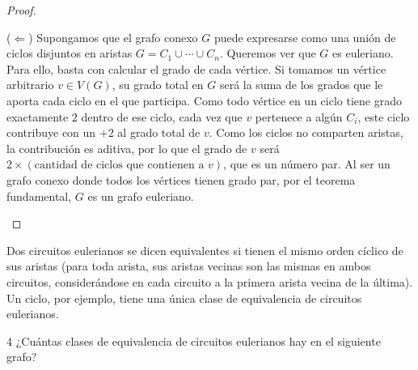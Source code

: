 \begin{proof}
\begin{enumerate}
              (\( \Longleftarrow \)) Supongamos que el grafo conexo \(G\) puede expresarse como una unión de ciclos disjuntos en aristas \(G = C_1 \cup \cdots \cup C_n\).
              Queremos ver que \(G\) es euleriano. Para ello, basta con calcular el grado de cada vértice. Si tomamos un vértice arbitrario \(v \in V(G)\), su grado total en \(G\) será la suma de los grados que le aporta cada ciclo en el que participa.
              Como todo vértice en un ciclo tiene grado exactamente 2 dentro de ese ciclo, cada vez que \(v\) pertenece a algún \(C_i\), este ciclo contribuye con un \(+2\) al grado total de \(v\).
              Como los ciclos no comparten aristas, la contribución es aditiva, por lo que el grado de \(v\) será \(2 \times (\text{cantidad de ciclos que contienen a } v)\), que es un número par.
              Al ser un grafo conexo donde todos los vértices tienen grado par, por el teorema fundamental, \(G\) es un grafo euleriano.
    \end{enumerate}
\end{proof}

\vspace{0.5cm}

\begin{definition}
    Dos circuitos eulerianos se dicen equivalentes si tienen el mismo orden cíclico
    de sus aristas (para toda arista, sus aristas vecinas son las mismas en ambos circuitos, considerándose en cada circuito a la primera arista vecina de la
    última). Un ciclo, por ejemplo, tiene una única clase de equivalencia de circuitos eulerianos.
\end{definition}

\begin{ejercicio}{4}
    ¿Cuántas clases de equivalencia de circuitos eulerianos hay en el siguiente grafo?
\end{ejercicio}

